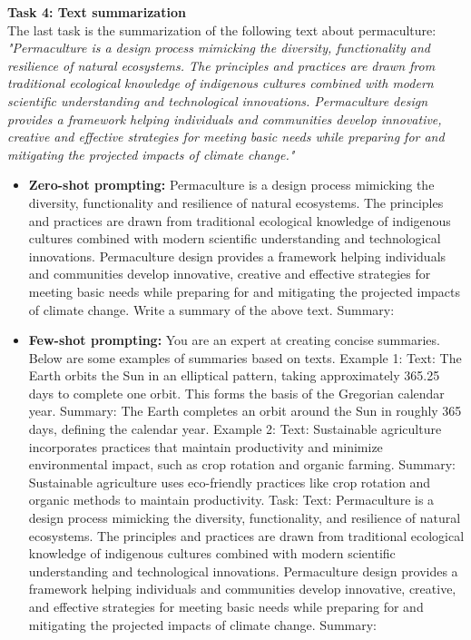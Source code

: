 \textbf{Task 4: Text summarization}\\
The last task is the summarization of the following text about permaculture: \textit{"Permaculture is a design process mimicking the diversity, functionality and resilience of natural ecosystems. The principles and practices are drawn from traditional ecological knowledge of indigenous cultures combined with modern scientific understanding and technological innovations. Permaculture design provides a framework helping individuals and communities develop innovative, creative and effective strategies for meeting basic needs while preparing for and mitigating the projected impacts of climate change."}\cite{permaculture}
\begin{itemize}
    \item \textbf{Zero-shot prompting:} Permaculture is a design process mimicking the diversity, functionality and resilience of natural ecosystems. The principles and practices are drawn from traditional ecological knowledge of indigenous cultures combined with modern scientific understanding and technological innovations. Permaculture design provides a framework helping individuals and communities develop innovative, creative and effective strategies for meeting basic needs while preparing for and mitigating the projected impacts of climate change. Write a summary of the above text. Summary:
    \item \textbf{Few-shot prompting:} You are an expert at creating concise summaries. Below are some examples of summaries based on texts.
    Example 1: Text: The Earth orbits the Sun in an elliptical pattern, taking approximately 365.25 days to complete one orbit. This forms the basis of the Gregorian calendar year. Summary: The Earth completes an orbit around the Sun in roughly 365 days, defining the calendar year.
    Example 2: Text: Sustainable agriculture incorporates practices that maintain productivity and minimize environmental impact, such as crop rotation and organic farming. Summary: Sustainable agriculture uses eco-friendly practices like crop rotation and organic methods to maintain productivity.
    Task: Text: Permaculture is a design process mimicking the diversity, functionality, and resilience of natural ecosystems. The principles and practices are drawn from traditional ecological knowledge of indigenous cultures combined with modern scientific understanding and technological innovations. Permaculture design provides a framework helping individuals and communities develop innovative, creative, and effective strategies for meeting basic needs while preparing for and mitigating the projected impacts of climate change. Summary:

\end{itemize}

